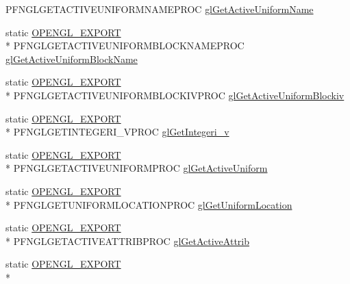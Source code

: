 \begin{DoxyCompactItemize}
P\+F\+N\+G\+L\+G\+E\+T\+A\+C\+T\+I\+V\+E\+U\+N\+I\+F\+O\+R\+M\+N\+A\+M\+E\+P\+R\+O\+C \hyperlink{class_agmd_1_1_g_l_driver_ab9d3d9142dd4298a1a3e8c4bbf021142}{gl\+Get\+Active\+Uniform\+Name}
\item 
static \hyperlink{_config_8h_a77401aa3bc0a379879047c1bd30f262e}{O\+P\+E\+N\+G\+L\+\_\+\+E\+X\+P\+O\+R\+T} \\*
P\+F\+N\+G\+L\+G\+E\+T\+A\+C\+T\+I\+V\+E\+U\+N\+I\+F\+O\+R\+M\+B\+L\+O\+C\+K\+N\+A\+M\+E\+P\+R\+O\+C \hyperlink{class_agmd_1_1_g_l_driver_a77da17d4d20489d1a5ff4ff1baa84522}{gl\+Get\+Active\+Uniform\+Block\+Name}
\item 
static \hyperlink{_config_8h_a77401aa3bc0a379879047c1bd30f262e}{O\+P\+E\+N\+G\+L\+\_\+\+E\+X\+P\+O\+R\+T} \\*
P\+F\+N\+G\+L\+G\+E\+T\+A\+C\+T\+I\+V\+E\+U\+N\+I\+F\+O\+R\+M\+B\+L\+O\+C\+K\+I\+V\+P\+R\+O\+C \hyperlink{class_agmd_1_1_g_l_driver_a6c6ee99d86d69e64c40e60f2bcfa29d3}{gl\+Get\+Active\+Uniform\+Blockiv}
\item 
static \hyperlink{_config_8h_a77401aa3bc0a379879047c1bd30f262e}{O\+P\+E\+N\+G\+L\+\_\+\+E\+X\+P\+O\+R\+T} \\*
P\+F\+N\+G\+L\+G\+E\+T\+I\+N\+T\+E\+G\+E\+R\+I\+\_\+\+V\+P\+R\+O\+C \hyperlink{class_agmd_1_1_g_l_driver_abb8b25a54988afb7f3add4885311e872}{gl\+Get\+Integeri\+\_\+v}
\item 
static \hyperlink{_config_8h_a77401aa3bc0a379879047c1bd30f262e}{O\+P\+E\+N\+G\+L\+\_\+\+E\+X\+P\+O\+R\+T} \\*
P\+F\+N\+G\+L\+G\+E\+T\+A\+C\+T\+I\+V\+E\+U\+N\+I\+F\+O\+R\+M\+P\+R\+O\+C \hyperlink{class_agmd_1_1_g_l_driver_a8cbb247c2b502e4183e9cd4617946971}{gl\+Get\+Active\+Uniform}
\item 
static \hyperlink{_config_8h_a77401aa3bc0a379879047c1bd30f262e}{O\+P\+E\+N\+G\+L\+\_\+\+E\+X\+P\+O\+R\+T} \\*
P\+F\+N\+G\+L\+G\+E\+T\+U\+N\+I\+F\+O\+R\+M\+L\+O\+C\+A\+T\+I\+O\+N\+P\+R\+O\+C \hyperlink{class_agmd_1_1_g_l_driver_a9b9203dfa86f50510f720cc7d93ab776}{gl\+Get\+Uniform\+Location}
\item 
static \hyperlink{_config_8h_a77401aa3bc0a379879047c1bd30f262e}{O\+P\+E\+N\+G\+L\+\_\+\+E\+X\+P\+O\+R\+T} \\*
P\+F\+N\+G\+L\+G\+E\+T\+A\+C\+T\+I\+V\+E\+A\+T\+T\+R\+I\+B\+P\+R\+O\+C \hyperlink{class_agmd_1_1_g_l_driver_a268d9abbb19319c52c93583a408ab96c}{gl\+Get\+Active\+Attrib}
\item 
static \hyperlink{_config_8h_a77401aa3bc0a379879047c1bd30f262e}{O\+P\+E\+N\+G\+L\+\_\+\+E\+X\+P\+O\+R\+T} \\*

\end{DoxyCompactItemize}
